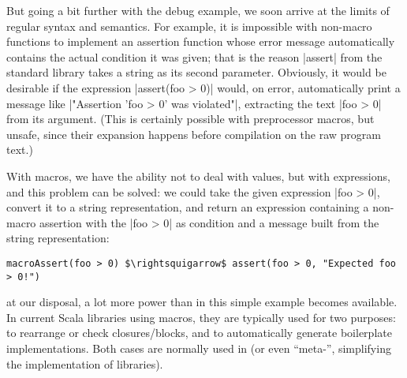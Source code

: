 But going a bit further with the debug example, we soon arrive at the limits of regular syntax and
semantics. For example, it is impossible with non-macro functions to implement an assertion function
whose error message automatically contains the actual condition it was given; that is the reason
|assert| from the standard library takes a string as its second parameter. Obviously, it would be
desirable if the expression |assert(foo > 0)| would, on error, automatically print a message like %
|"Assertion 'foo > 0' was violated"|, extracting the text |foo > 0| from its argument. (This is
certainly possible with preprocessor macros, but unsafe, since their expansion happens before
compilation on the raw program text.)

With macros, we have the ability not to deal with values, but with expressions, and this problem can
be solved: we could take the given expression |foo > 0|, convert it to a string representation, and
return an expression containing a non-macro assertion with the |foo > 0| as condition and a message
built from the string representation:
\begin{lstlisting}[mathescape]
  macroAssert(foo > 0) $\rightsquigarrow$ assert(foo > 0, "Expected foo > 0!")
\end{lstlisting}

 at our disposal, a lot more power than in this simple example
becomes available. In current Scala libraries using macros, they are typically used for two
purposes: to rearrange or check closures/blocks, and to automatically generate boilerplate
implementations. Both cases are normally used in \dsls{} (or even \enquote{meta-\dsls{}}, simplifying
the implementation of libraries).

